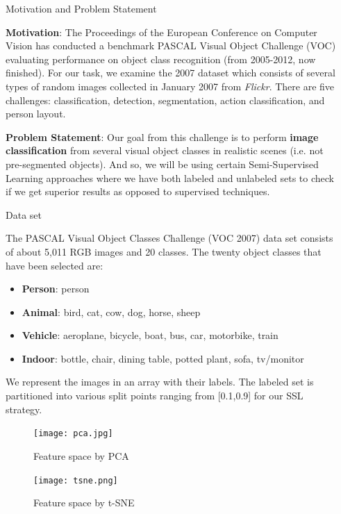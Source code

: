 \documentclass[final]{beamer}
\newlength{\sepwidth}
\newlength{\colwidth}
\newcommand{\separatorcolumn}{\begin{column}{\sepwidth}\end{column}}
\begin{document}
\begin{frame}[t]
\begin{columns}[t]
\separatorcolumn

\begin{column}{\colwidth}

  \begin{block}{Motivation and Problem Statement}
  
    \textbf{Motivation}: The Proceedings of the European Conference on Computer Vision has conducted a benchmark PASCAL Visual Object Challenge (VOC) evaluating performance on object class recognition (from 2005-2012, now finished). For our task, we examine the 2007 dataset which consists of several types of random images collected in January 2007 from \textit{Flickr}. There are five challenges: classification, detection, segmentation, action classification, and person layout. 
    
    \textbf{Problem Statement}: Our goal from this challenge is to perform \textbf{image classification} from several visual object classes in realistic scenes (i.e. not pre-segmented objects). And so, we will be using certain Semi-Supervised Learning approaches where we have both labeled and unlabeled sets to check if we get superior results as opposed to supervised techniques.
  \end{block}

  \begin{block}{Data set}
  
    The PASCAL Visual Object Classes Challenge (VOC 2007) data set consists of about 5,011 RGB images and 20 classes. The twenty object classes that have been selected are:

    \begin{itemize}
      \item \textbf{Person}: person
      \item \textbf{Animal}: bird, cat, cow, dog, horse, sheep
      \item \textbf{Vehicle}: aeroplane, bicycle, boat, bus, car, motorbike, train
      \item \textbf{Indoor}: bottle, chair, dining table, potted plant, sofa, tv/monitor
    \end{itemize}
    We represent the images in an array with their labels. The labeled set is partitioned into various split points ranging from [0.1,0.9] for our SSL strategy.
    
    \begin{figure}[ht]
    \begin{minipage}[b]{.40\textwidth}
    \centering
    \texttt{[image: pca.jpg]}
    \caption{Feature space by PCA}
    \label{fig:pca}
    \end{minipage}\qquad
    \begin{minipage}[b]{.40\textwidth}
    \centering
    \texttt{[image: tsne.png]}
    \caption{Feature space by t-SNE}
    \label{fig:tsne}
    \end{minipage}
    \end{figure} 


\end{block}
\end{column}
\end{columns}
\end{frame}
\end{document}
